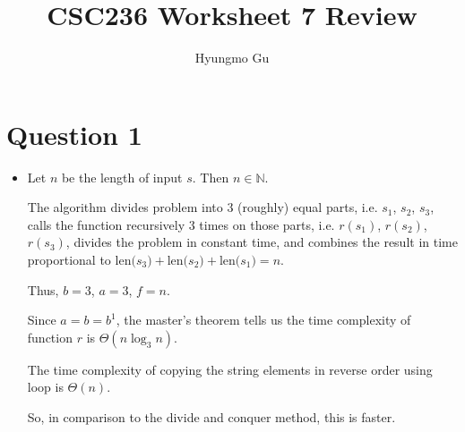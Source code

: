 \documentclass[12pt]{article}
\begin{document}
\title{CSC236 Worksheet 7 Review}
\author{Hyungmo Gu}
\maketitle

\section*{Question 1}
\begin{itemize}
    \item

    Let $n$ be the length of input $s$. Then $n \in \mathbb{N}$.

    \bigskip

    The algorithm divides problem into 3 (roughly) equal parts, i.e. $s_1$, $s_2$,
    $s_3$, calls the function recursively 3 times on those parts, i.e. $r(s_1)$,
    $r(s_2)$, $r(s_3)$, divides the problem in constant time, and combines the
    result in time proportional to $\text{len($s_3$)} + \text{len($s_2$)} + \text{len($s_1$)} = n$.

    \bigskip

    Thus, $b = 3$, $a = 3$, $f = n$.

    \bigskip

    Since $a = b = b^1$, the master's theorem tells us the time complexity of
    function $r$ is $\Theta(n\log_3 n)$.

    \bigskip

    The time complexity of copying the string elements in reverse order using loop
    is $\Theta(n)$.

    \bigskip

    So, in comparison to the divide and conquer method, this is faster.
\end{itemize}
\end{document}
